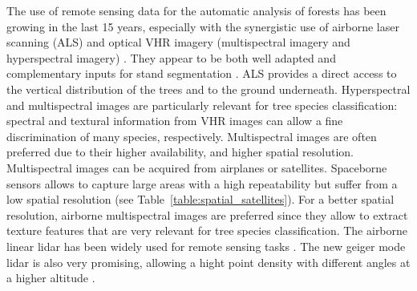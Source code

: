 The use of remote sensing data for the automatic analysis of forests has been growing in the last 15 years, especially with the synergistic use of airborne laser scanning (ALS) and optical VHR imagery (multispectral imagery and hyperspectral imagery) \citep{torabzadeh2014fusion,White2016CJRS}. They appear to be both well adapted and complementary inputs for stand segmentation \citep{dalponte2012tree,dalponte2015delineation,7500049}. ALS provides a direct access to the vertical distribution of the trees and to the ground underneath. Hyperspectral and multispectral images are particularly relevant for tree species classification: spectral and textural information from VHR  images can allow a fine discrimination of many species, respectively. Multispectral images are often preferred due to their higher availability, and higher spatial resolution. Multispectral images can be acquired from airplanes or satellites. Spaceborne sensors allows to capture large areas with a high repeatability but suffer from a low spatial resolution (see Table~\ref{table:spatial_satellites}). For a better spatial resolution, airborne multispectral images are preferred since they allow to extract texture features that are very relevant for tree species classification. The airborne linear lidar has been widely used for remote sensing tasks \citep{lim2003lidar, shan2008topographic, vosselman2010airborne}. The new geiger mode lidar is also very promising, allowing a hight point density with different angles at a higher altitude \citep{ullrich2016linear}. \\

